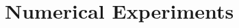 \documentclass[letterpaper, 10 pt, conference]{ieeeconf}  %
\newtheorem{remark}{Remark}
\newcommand{\mpc}[1]{{\color{cyan} #1}}
\newcommand{\mpc}[1]{#1}
\begin{document}



%
%

\mpc{\section{Numerical Experiments}\label{sec::ex}}
\end{document}
